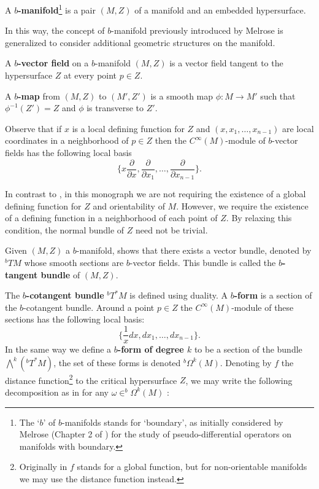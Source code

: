\begin{definition}
A \textbf{$b$-manifold}\footnote{The `$b$' of $b$-manifolds stands for `boundary', as initially considered by Melrose {(Chapter 2 of \cite{Melrose93})} for the study of pseudo-differential operators on manifolds with boundary.} is a pair $(M,Z)$ of a manifold and an {embedded} hypersurface.
\end{definition}

 In this way, the concept of $b$-manifold previously introduced by Melrose is generalized to consider additional geometric structures on the manifold.

\begin{definition}
A \textbf{$b$-vector field} on a $b$-manifold $(M,Z)$ is a vector field tangent to the hypersurface $Z$ at every point $p\in Z$.
\end{definition}

{
\begin{definition}
A \textbf{$b$-map} from $(M,Z)$ to $(M',Z')$ is a {smooth} map $\phi:M \rightarrow M'$ such that $\phi^{-1}(Z') = Z$ and $\phi$ is transverse to $Z'$.
\end{definition}
}

Observe that if $x$ is a local defining function for $Z$ {and $(x, x_1, \ldots, x_{n-1})$ are local coordinates in a neighborhood of $p \in Z$} then {the $C^\infty(M)$-module of $b$-vector fields has the following local basis}
\begin{equation}\label{eq:generatebvectors}
\{x \frac{\partial}{\partial{x}}, \frac{\partial}{\partial{x_1}},\ldots, \frac{\partial}{\partial{x_{n-1}}}\}.
\end{equation}

In contrast to \cite{GMP10}, in this monograph we are not requiring the existence of a global defining function for $Z$ and orientability of $M$. However,  we require the existence of a defining  function in a neighborhood of each {point} of $Z$. {By relaxing this condition, the normal bundle of $Z$  need not  be trivial.}


{Given $(M,Z)$ a $b$-manifold, \cite{GMP10} shows that there exists a vector bundle,
denoted by $^b TM$  whose smooth sections are $b$-vector fields. This bundle
is called the \textbf{$b$-tangent bundle} of $(M,Z)$.}

The \textbf{$b$-cotangent bundle} $^b T^*M$ is defined using duality. A \textbf{$b$-form} is a  section of the $b$-cotangent bundle. {Around a point $p\in Z$ the $C^\infty(M)$-module of {these} sections has the following local basis:}
\begin{equation}\label{eq:generatebforms}
\{\frac{1}{x} dx, d x_1,\ldots, d x_{n-1}\}.
\end{equation}
In the same way we define a \textbf{$b$-form of degree $k$} to be a section of the bundle $\bigwedge^k(^b T^*M)$, the set of these forms is denoted $^b\Omega^k(M)$. Denoting by $f$ the distance function\footnote{Originally in \cite{GMP10} $f$ stands for a global function, but for non-orientable manifolds we may  use the distance function instead.} to the {critical hypersurface} $Z$, we may write the following decomposition as in \cite{GMP10} {for any $\omega \in ^b\Omega^k(M)$} :

